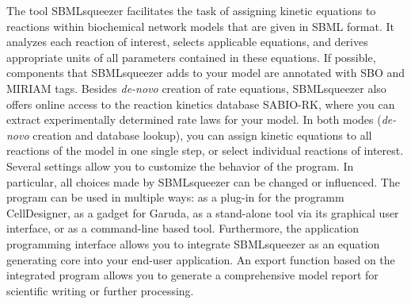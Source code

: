 The tool SBMLsqueezer facilitates the task of assigning kinetic equations to
reactions within biochemical network models that are given in \acs{SBML} format.
It analyzes each reaction of interest, selects applicable equations, and derives
appropriate units of all parameters contained in these equations.
If possible, components that SBMLsqueezer adds to your model are annotated with
\ac{SBO} and \ac{MIRIAM} tags.
Besides \emph{de-novo} creation of rate equations, SBMLsqueezer also offers
online access to the reaction kinetics database \ac{SABIO-RK}, where you can extract
experimentally determined rate laws for your model.
In both modes (\emph{de-novo} creation and database lookup), you can assign kinetic equations to all reactions of the model in
one single step, or select individual reactions of interest. 
Several settings allow you to customize the behavior of the program.
In particular, all choices made by SBMLsqueezer can be changed or influenced.
The program can be used in multiple ways: as a plug-in for the programm
CellDesigner, as a gadget for Garuda, as a stand-alone tool via its graphical
user interface, or as a command-line based tool.
Furthermore, the application programming interface allows you to integrate
SBMLsqueezer as an equation generating core into your end-user application.
An export function based on the integrated program \SBMLLaTeXs{} allows you to
generate a comprehensive model report for scientific writing or further
processing.
